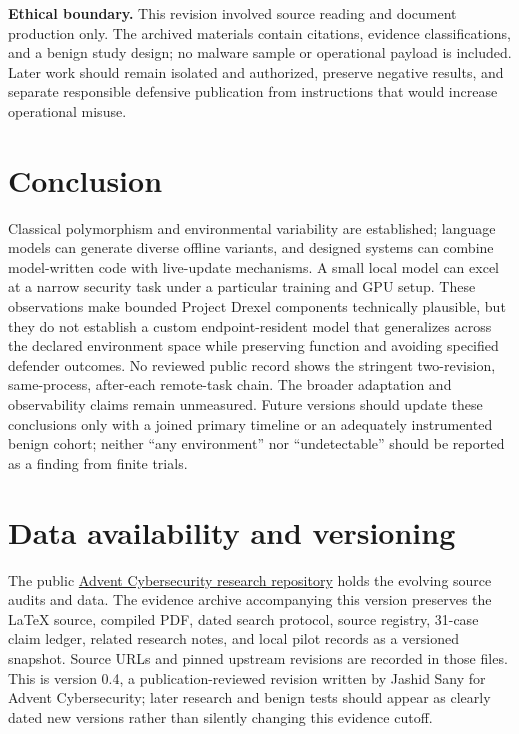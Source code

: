 \documentclass[11pt,letterpaper]{article}
\begin{document}
\textbf{Ethical boundary.} This revision involved source reading and document production only. The archived materials contain citations, evidence classifications, and a benign study design; no malware sample or operational payload is included. Later work should remain isolated and authorized, preserve negative results, and separate responsible defensive publication from instructions that would increase operational misuse.

\section{Conclusion}\label{sec:conclusion}

Classical polymorphism and environmental variability are established; language models can generate diverse offline variants, and designed systems can combine model-written code with live-update mechanisms. A small local model can excel at a narrow security task under a particular training and GPU setup. These observations make bounded Project Drexel components technically plausible, but they do not establish a custom endpoint-resident model that generalizes across the declared environment space while preserving function and avoiding specified defender outcomes. No reviewed public record shows the stringent two-revision, same-process, after-each remote-task chain. The broader adaptation and observability claims remain unmeasured. Future versions should update these conclusions only with a joined primary timeline or an adequately instrumented benign cohort; neither ``any environment'' nor ``undetectable'' should be reported as a finding from finite trials.

\section*{Data availability and versioning}

The public \href{https://github.com/Advent-Cybersecurity/advent-drexel}{Advent Cybersecurity research repository} holds the evolving source audits and data. The evidence archive accompanying this version preserves the LaTeX source, compiled PDF, dated search protocol, source registry, 31-case claim ledger, related research notes, and local pilot records as a versioned snapshot. Source URLs and pinned upstream revisions are recorded in those files. This is version 0.4, a publication-reviewed revision written by Jashid Sany for Advent Cybersecurity; later research and benign tests should appear as clearly dated new versions rather than silently changing this evidence cutoff.
\end{document}

